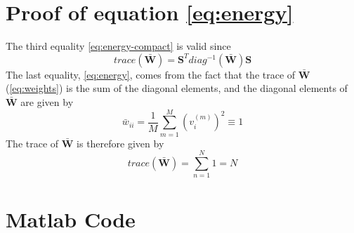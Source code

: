 \appendix
\section{Proof of equation \ref{eq:energy}}\label{sec:proofenergy}
The third equality \cref{eq:energy-compact} is valid since 
\begin{equation*}
    trace(\bar{\mathbf{W}}) = \mathbf{S}^T diag^{-1}(\bar{\mathbf{W}})\mathbf{S}
\end{equation*}
The last equality, \cref{eq:energy}, comes from the fact that the trace of $\bar{\mathbf{W}}$ (\cref{eq:weights}) is the sum of the diagonal elements, and the diagonal elements of $\bar{\mathbf{W}}$ are given by
\begin{equation}
    \bar{w}_{ii} = \frac{1}{M} \sum_{m=1}^M (v_i^{(m)})^2 \equiv 1
\end{equation}
The trace of $\bar{\mathbf{W}}$ is therefore given by 
\begin{equation}
    trace(\bar{\mathbf{W}}) = \sum_{n=1}^N 1 = N
\end{equation}

\section{Matlab Code} \label{sec:matlab_code}

